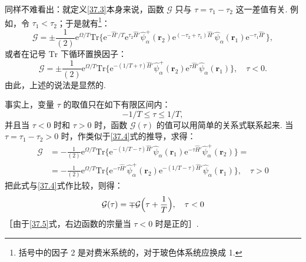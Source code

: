 同样不难看出：就定义\eqref{37.3}本身来说，函数 $\mathcal G$ 只与 $\tau=\tau_1-\tau_2$ 这一差值有关. 例如，令 $\tau_1<\tau_2$；于是就有\footnote{括号中的因子 2 是对费米系统的，对于玻色体系统应换成 1.}：
\begin{equation*}
\mathcal G=\pm\frac{1}{(2)}\mathrm{e}^{\varOmega/T}\mathrm{Tr}\bigl\{\mathrm{e}^{-\hat H'/T}
\mathrm{e}^{\tau_2\hat H'}\hat\psi^{+}_{\alpha}(\bm r_2)
\mathrm{e}^{(-\tau_2+\tau_1)\hat H'}\hat\psi_{\alpha}(\bm r_1)
\mathrm{e}^{-\tau_1\hat H'}\bigr\},
\end{equation*}
或者在记号 $\mathrm{Tr}$ 下循环置换因子：
\begin{equation}
\mathcal G=\pm\frac{1}{(2)}\mathrm{e}^{\varOmega/T}\mathrm{Tr}\bigl\{\mathrm{e}^{-(1/T+\tau)\hat H'}
\hat\psi^{+}_{\alpha}(\bm r_2)\mathrm{e}^{\tau\hat H'}\hat\psi_{\alpha}(\bm r_1)\bigr\},\quad\tau<0.
\label{37.4}
\end{equation}
由此，上述的说法是显然的.

事实上，变量 $\tau$ 的取值只在如下有限区间内：
\begin{equation}
-1/T\leqslant\tau\leqslant 1/T,
\label{37.5}
\end{equation}
并且当 $\tau<0$ 时和 $\tau>0$ 时，函数 $\mathcal G(\tau)$ 的值可以用简单的关系式联系起来. 当 $\tau=\tau_1-\tau_2>0$ 时，作类似于\eqref{37.4}式的推导，求得：
\begin{equation*}
\begin{aligned}
\mathcal G&=-\frac{1}{(2)}\mathrm{e}^{\varOmega/T}\mathrm{Tr}\bigl\{\mathrm{e}^{-(1/T-\tau)\hat H'}
\hat\psi_{\alpha}(\bm r_1)\mathrm{e}^{-\tau\hat H'}\hat\psi^{+}_{\alpha}(\bm r_2)\bigr\}=\\
&=-\frac{1}{(2)}\mathrm{e}^{\varOmega/T}\mathrm{Tr}\bigl\{\mathrm{e}^{-\tau\hat H'}
\hat\psi^{+}_{\alpha}(\bm r_2)\mathrm{e}^{-(1/T-\tau)\hat H'}\hat\psi_{\alpha}(\bm r_1)\bigr\},\quad\tau>0
\end{aligned}
\end{equation*}
把此式与\eqref{37.4}式作比较，则得：
\begin{equation}
\mathcal G(\tau)=\mp\mathcal G\Bigl(\tau+\frac{1}{T}\Bigr),\quad\tau<0
\label{37.6}
\end{equation}
［由于\eqref{37.5}式，右边函数的宗量当 $\tau<0$ 时是正的］.

